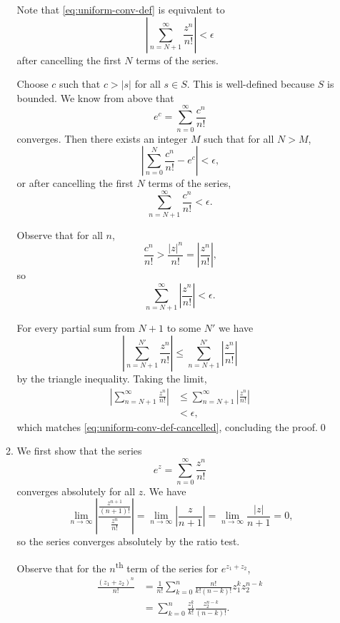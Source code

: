 \documentclass[oneside]{article}
\newcommand\abs[1]{\left|#1\right|}
\begin{document}
\begin{enumerate}[label=\textbf{\arabic*.}]
\begin{enumerate}[label=\textbf{(\alph*)}]
    Note that \eqref{eq:uniform-conv-def} is equivalent to \begin{equation}
      \label{eq:uniform-conv-def-cancelled}
      \abs{\sum_{n=N+1}^\infty\frac{z^n}{n!}} < \epsilon
    \end{equation} after cancelling the first $N$ terms of the series.

    Choose $c$ such that $c > \abs{s}$ for all $s \in S$. This is well-defined
    because $S$ is bounded. We know from above that \[
      e^c = \sum_{n=0}^\infty \frac{c^n}{n!}
    \] converges. Then there exists an integer $M$ such that for all $N > M$,\[
      \abs{\sum_{n=0}^N \frac{c^n}{n!} - e^c} < \epsilon \text{,}
    \] or after cancelling the first $N$ terms of the series,\[
      \sum_{n=N+1}^\infty \frac{c^n}{n!} < \epsilon \text{.}
    \]

    Observe that for all $n$, \[
      \frac{c^n}{n!} > \frac{\abs{z}^n}{n!} = \abs{\frac{z^n}{n!}}\text{,}
    \] so \[
      \sum_{n=N+1}^\infty \abs{\frac{z^n}{n!}} < \epsilon \text{.}
    \]

    For every partial sum from $N+1$ to some $N'$ we have\[
      \abs{\sum_{n=N+1}^{N'} \frac{z^n}{n!}}
      \leq \sum_{n=N+1}^{N'} \abs{\frac{z^n}{n!}}
    \] by the triangle inequality. Taking the limit, \begin{align*}
      \abs{\sum_{n=N+1}^\infty \frac{z^n}{n!}}
      &\leq \sum_{n=N+1}^\infty \abs{\frac{z^n}{n!}} \\
      &< \epsilon\text{,}
    \end{align*} which matches \eqref{eq:uniform-conv-def-cancelled}, concluding
    the proof.\qed

    \item We first show that the series \[
      e^z = \sum_{n=0}^\infty \frac{z^n}{n!}
    \] converges absolutely for all $z$. We have \[
      \lim_{n\to\infty}\abs{\frac{\frac{z^{n+1}}{(n+1)!}}{\frac{z^n}{n!}}}
      = \lim_{n\to\infty}\abs{\frac{z}{n+1}}
      = \lim_{n\to\infty}\frac{\abs{z}}{n+1}
      = 0\text{,}
    \] so the series converges absolutely by the ratio test.

    Observe that for the $n$\textsuperscript{th} term of the series for
    $e^{z_1+z_2}$,\begin{align*}
      \frac{(z_1+z_2)^n}{n!}
      &= \frac{1}{n!}\sum_{k=0}^n \frac{n!}{k!(n-k)!} z_1^k z_2^{n-k} \\
      &= \sum_{k=0}^n \frac{z_1^k}{k!} \frac{z_2^{n-k}}{(n-k)!} \text{.}
    \end{align*}


\end{enumerate}
\end{enumerate}
\end{document}
